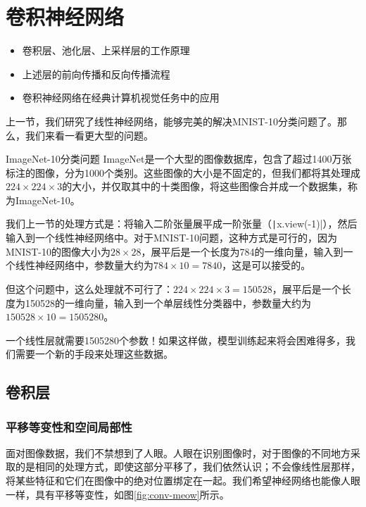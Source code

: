 \chapter{卷积神经网络}

\begin{intro}
\begin{itemize}
    \item 卷积层、池化层、上采样层的工作原理
    \item 上述层的前向传播和反向传播流程
    \item 卷积神经网络在经典计算机视觉任务中的应用
\end{itemize}
\end{intro}

上一节，我们研究了线性神经网络，能够完美的解决MNIST-10分类问题了。那么，我们来看一看更大型的问题。
\begin{framed}{ImageNet-10分类问题}
ImageNet\cite{2009ImageNet}是一个大型的图像数据库，包含了超过1400万张标注的图像，分为1000个类别。这些图像的大小是不固定的，但我们都将其处理成$224\times 224 \times 3$的大小，并仅取其中的十类图像，将这些图像合并成一个数据集，称为ImageNet-10。
\end{framed}

我们上一节的处理方式是：将输入二阶张量展平成一阶张量（\texttt|x.view(-1)|），然后输入到一个线性神经网络中。对于MNIST-10问题，这种方式是可行的，因为MNIST-10的图像大小为$28\times 28$，展平后是一个长度为784的一维向量，输入到一个线性神经网络中，参数量大约为$784 \times 10 = 7840$，这是可以接受的。

但这个问题中，这么处理就不可行了：$224\times 224 \times 3 = 150528$，展平后是一个长度为150528的一维向量，输入到一个单层线性分类器中，参数量大约为$150528 \times 10 = 1505280$。

一个线性层就需要1505280个参数！如果这样做，模型训练起来将会困难得多，我们需要一个新的手段来处理这些数据。

\section{卷积层}

\subsection{平移等变性和空间局部性}

面对图像数据，我们不禁想到了人眼。人眼在识别图像时，对于图像的不同地方采取的是相同的处理方式，即使这部分平移了，我们依然认识；不会像线性层那样，将某些特征和它们在图像中的绝对位置绑定在一起。我们希望神经网络也能像人眼一样，具有平移等变性，如图\cref{fig:conv-meow}所示。

